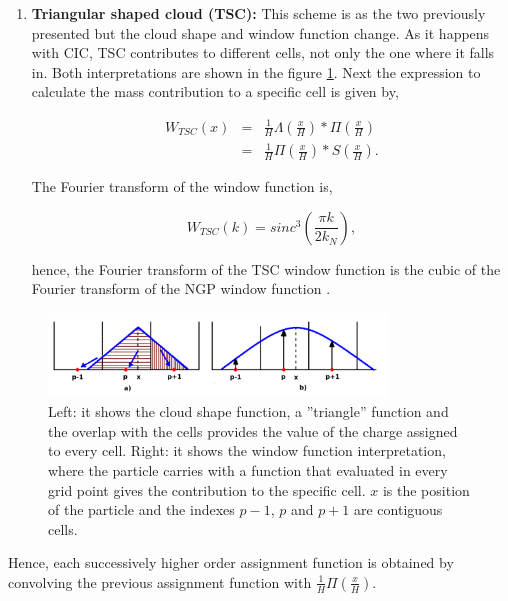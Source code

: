\begin{enumerate}
\item \textbf{ Triangular shaped cloud (TSC): } This scheme is as the two previously presented but the cloud
shape and window function change. As it happens with CIC, TSC contributes to different
cells, not only the one where it falls in. Both interpretations are shown in the figure \ref{TSC}.
Next the expression to calculate the mass contribution to a specific cell is given by,

\begin{eqnarray*}
 W_{TSC}(x)  &=& \frac{1}{H}\Lambda \left( \frac{x}{H} \right)*\Pi \left(\frac{x}{H}\right) \\ 
&  = &\frac{1}{H}\Pi\left(\frac{x}{H}\right)*S\left(\frac{x}{H}\right) .
\end{eqnarray*}

The Fourier transform of the window function is, 

\[ W_{TSC}(k)= sinc^3\left(\frac{\pi k}{2k_N} \right),\]

hence, the Fourier transform of the TSC window function is the cubic of the Fourier 
transform of the NGP window function \cite{hockney}. 

\end{enumerate}

\begin{figure}[htbp]
       \centering
               \includegraphics[width=0.8\textwidth]{Images/chapter3/TSC.png}
       \caption{\small Left: it shows the cloud shape function, a ''triangle'' function
       and the overlap with the cells provides the value of the charge assigned to every cell. 
       Right: it shows the window function interpretation, where the particle carries
       with a function that evaluated in every grid point gives the contribution to the specific cell. 
       $x$ is the position of the particle and the indexes $p-1$, $p$ and $p+1$ are contiguous cells.}
       \label{TSC}
 \end{figure}


Hence, each successively higher order assignment function is obtained by convolving the previous
assignment function with $\frac{1}{H}\Pi\left(\frac{x}{H}\right)$. 

